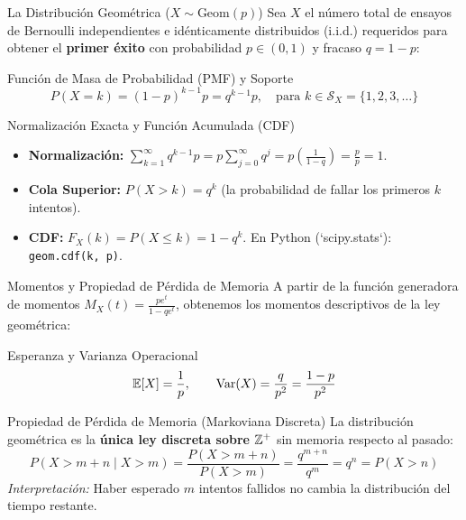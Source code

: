 \documentclass[10pt, aspectratio=169]{beamer}
\begin{document}
\begin{frame}{La Distribución Geométrica ($X \sim \text{Geom}(p)$)}
  \footnotesize
  Sea $X$ el número total de ensayos de Bernoulli independientes e idénticamente distribuidos (i.i.d.) requeridos para obtener el \textbf{primer éxito} con probabilidad $p \in (0, 1)$ y fracaso $q = 1-p$: \pause

  \vspace{0.1cm}
  \begin{block}{Función de Masa de Probabilidad (PMF) y Soporte}
    $$P(X = k) = (1-p)^{k-1}p = q^{k-1}p, \quad \text{para } k \in \mathcal{S}_X = \{1, 2, 3, \dots\}$$
  \end{block}

  \vspace{0.1cm}
  \pause
  \begin{alertblock}{Normalización Exacta y Función Acumulada (CDF)}
    \begin{itemize}\itemsep=0.06cm
      \item \textbf{Normalización:} $\sum_{k=1}^{\infty} q^{k-1}p = p \sum_{j=0}^{\infty} q^j = p \left(\frac{1}{1-q}\right) = \frac{p}{p} = 1$. \pause
      \item \textbf{Cola Superior:} $P(X > k) = q^k$ (la probabilidad de fallar los primeros $k$ intentos).
      \item \textbf{CDF:} $F_X(k) = P(X \le k) = 1 - q^k$. En Python (`scipy.stats`): \texttt{geom.cdf(k, p)}.
    \end{itemize}
  \end{alertblock}
\end{frame}

\begin{frame}{Momentos y Propiedad de Pérdida de Memoria}
  \footnotesize
  A partir de la función generadora de momentos $M_X(t) = \frac{pe^t}{1-qe^t}$, obtenemos los momentos descriptivos de la ley geométrica: \pause

  \vspace{0.1cm}
  \begin{block}{Esperanza y Varianza Operacional}
    $$\mathbb{E}[X] = \dfrac{1}{p}, \qquad \operatorname{Var}(X) = \dfrac{q}{p^2} = \dfrac{1-p}{p^2}$$
  \end{block}

  \vspace{0.1cm}
  \pause
  \begin{alertblock}{Propiedad de Pérdida de Memoria (Markoviana Discreta)}
    La distribución geométrica es la \textbf{única ley discreta sobre $\mathbb{Z}^+$} sin memoria respecto al pasado:
    $$P(X > m+n \mid X > m) = \dfrac{P(X > m+n)}{P(X > m)} = \dfrac{q^{m+n}}{q^m} = q^n = P(X > n)$$
    \scriptsize\emph{Interpretación:} Haber esperado $m$ intentos fallidos no cambia la distribución del tiempo restante.
  \end{alertblock}
\end{frame}
\end{document}
